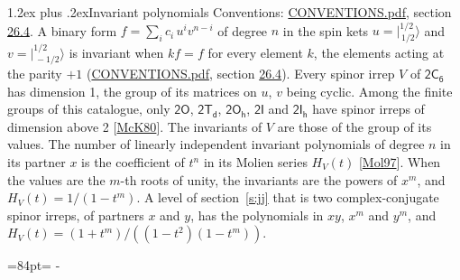 \documentclass[10pt,a4paper]{article}
\makeatletter
\renewcommand\section{\@startsection{section}{1}{\z@}{-3ex plus -1ex minus -.2ex}%
  {1.2ex plus .2ex}{\normalfont\large\sffamily\bfseries\color{parttitle}}}
\newcommand{\needspace}[1]{\par\penalty-100\begingroup\dimen0=#1\relax\dimen2=\pagegoal
  \advance\dimen2-\pagetotal\ifdim\dimen0>\dimen2\relax\ifdim\dimen2>0pt\vfil\break\fi\fi
  \endgroup}
\numberwithin{equation}{section}
\newcommand{\grp}[1]{\mathsf{#1}}
\newcommand{\jm}[2]{\bigl\lvert{}^{#1}_{\,#2}\bigr\rangle}
\makeatother
\begin{document}
\section{Invariant polynomials}\label{s:invariants}
Conventions: \href{../../CONVENTIONS.pdf}{CONVENTIONS.pdf}, section \href{../../CONVENTIONS.pdf\#conv.26.4}{26.4}.
\leavevmode\label{n:local.binary.form}A binary form $f = \sum_i c_i\, u^i v^{n-i}$ of degree $n$ in the spin kets $u = \jm{1/2}{1/2}$ and $v = \jm{1/2}{-1/2}$ is invariant when $k f = f$ for every element $k$, the elements acting at the parity $+1$ (\href{../../CONVENTIONS.pdf}{CONVENTIONS.pdf}, section \href{../../CONVENTIONS.pdf\#conv.26.4}{26.4}).
\leavevmode\label{n:function.hilbert}Every spinor irrep $V$ of $\grp{2C_{6}}$ has dimension 1, the group of its matrices on $u$, $v$ being cyclic. Among the finite groups of this catalogue, only $\grp{2O}$, $\grp{2T_{d}}$, $\grp{2O_{h}}$, $\grp{2I}$ and $\grp{2I_{h}}$ have spinor irreps of dimension above 2 [\href{../../../REFERENCES.pdf\#ref.McK80}{McK80}]. The invariants of $V$ are those of the group of its values. \label{n:local.partner.x}The number of linearly independent invariant polynomials of degree $n$ in its partner $x$ is the coefficient of $t^n$ in its Molien series $H_V(t)$ [\href{../../../REFERENCES.pdf\#ref.Mol97}{Mol97}]. When the values are the $m$-th roots of unity, the invariants are the powers of $x^{m}$, and $H_V(t) = 1/(1 - t^{m})$. A level of section~\ref{s:jj} that is two complex-conjugate spinor irreps, of partners $x$ and $y$, has the polynomials in $xy$, $x^{m}$ and $y^{m}$, and $H_V(t) = (1 + t^{m})/((1 - t^{2})(1 - t^{m}))$.
\needspace{84pt}
\end{document}
